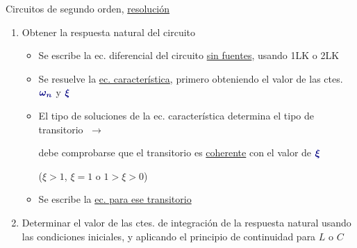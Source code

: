 \documentclass[aspectratio=169, usenames,svgnames,dvipsnames]{beamer}
\begin{document}
\begin{frame}{Circuitos de segundo orden, \hspace{3mm}\underline{resolución}}
    \vspace{2mm}
    
    \begin{enumerate}
        \item Obtener la \alert{respuesta natural} del circuito

        \begin{itemize}
            \normalsize
            \vspace{1mm}
            \item Se escribe la \alert{ec. diferencial del circuito} \underline{sin fuentes}, usando 1LK o 2LK 

            \vspace{1mm}
            \item Se resuelve la \hyperlink{diapo:ec_caracteristica}{ec. característica}, primero obteniendo el valor de las \alert{ctes.} ${\boldsymbol{\color{blue!50!black} \omega_n}}$ y ${\boldsymbol{\color{blue!50!black} \xi}}$
            
            \vspace{1mm}
            \item El tipo de soluciones de la ec. característica determina el \alert{tipo de transitorio} $\;\rightarrow$
            
            debe comprobarse que el \alert{transitorio} es \hyperlink{diapo:transitorios_2doOrden}{coherente} con el \alert{valor de} ${\boldsymbol{\color{blue!50!black} \xi}}$ 
            
            ($\xi>1$,\;\; $\xi=1$\;\; o\;\; $1>\xi>0$) 

            \vspace{1mm}
            \item Se escribe la \hyperlink{diapo:transitorios_2doOrden}{ec. para ese transitorio}
        \end{itemize}
        
        \vspace{1mm}
        \item Determinar el valor de las \alert{ctes. de integración} de la respuesta natural usando las \alert{condiciones iniciales}, y aplicando el \alert{principio de continuidad} para \hyperlink{diapo:continuidad_L}{$L$} o \hyperlink{diapo:continuidad_C}{$C$}
        

\end{enumerate}
\end{frame}
\end{document}
